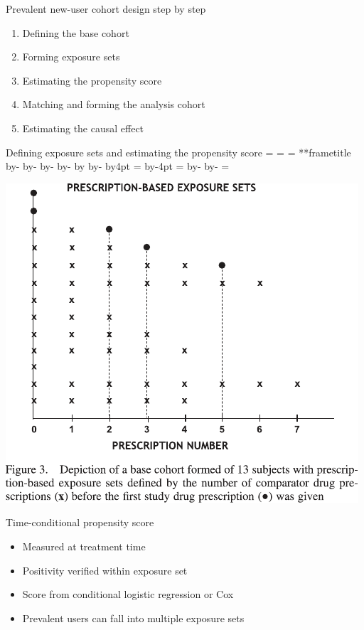 \documentclass[aspectratio=169,12pt]{beamer} %
\makeatletter
\newif\ifsidebartheme
\newcommand*{\calculatespace}{%
    \contentheight=\paperheight%
    \ifx\beamer@frametitle\@empty%
        \setbox\@tempboxa=\box\voidb@x%
      \else%
        \setbox\@tempboxa=\vbox{%
          \vbox{}%
          {\parskip0pt\usebeamertemplate***{frametitle}}%
        }%
        \ifsidebartheme%
          \advance\contentheight by-1em%
        \fi%
      \fi%
    \advance\contentheight by-\ht\@tempboxa%
    \advance\contentheight by-\dp\@tempboxa%
    \advance\contentheight by-\beamer@frametopskip%
    \ifbeamer@plainframe%
    \contentbottom=0pt%
    \else%
    \advance\contentheight by-\headheight%
    \advance\contentheight by\headdp%
    \advance\contentheight by-\footheight%
    \advance\contentheight by4pt%
    \contentbottom=\footheight%
    \advance\contentbottom by-4pt%
    \fi%
    \contentwidth=\paperwidth%
    \ifbeamer@plainframe%
    \contentleft=0pt%
    \else%
    \advance\contentwidth by-\beamer@rightsidebar%
    \advance\contentwidth by-\beamer@leftsidebar\relax%
    \contentleft=\beamer@leftsidebar%
    \fi%
}
\makeatother
\begin{document}
\begin{frame}{Prevalent new-user cohort design step by step}
    \begin{enumerate}
	\item Defining the base cohort
	\item Forming exposure sets
	\item Estimating the propensity score
	\item Matching and forming the analysis cohort
	\item Estimating the causal effect
    \end{enumerate}
\end{frame}

\begin{frame}{Defining exposure sets and estimating the propensity score}
    \calculatespace%
    \begin{center}
	\includegraphics[height=0.85\contentheight]{ref/suimoodell-fig3.pdf}
    \end{center}

\end{frame}

\begin{frame}{Time-conditional propensity score}
	\begin{itemize}
		\item Measured at treatment time
		\item Positivity verified within exposure set
		\item Score from conditional logistic regression or Cox
		\item Prevalent users can fall into multiple exposure sets
	\end{itemize}
\end{frame}
\end{document}
